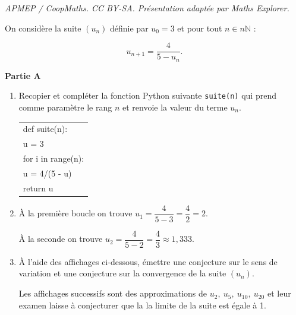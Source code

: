 \documentclass[10pt]{article}
\providecommand{\N}{\mathbb{N}}
\begin{document}
\noindent\textit{APMEP / CoopMaths. CC BY-SA. Présentation adaptée par Maths Explorer.}\par\medskip
\medskip





On considère la suite $\left(u_n\right)$ définie par $u_0 = 3$ et pour tout $n \in n\N$ :

\[u_{n+1} = \dfrac{4}{5 - u_n}.\]

\medskip

\textbf{Partie A}

\medskip

\begin{enumerate}
\item Recopier et compléter la fonction Python suivante \texttt{suite(n)} qui prend comme
paramètre le rang $n$ et renvoie la valeur du terme $u_n$.

\begin{center}
\begin{tabular}{|l|}\hline
def suite(n):\\
\qquad u = 3\\
\qquad for i in range(n)\quad  :\\
\qquad \qquad u = 4/(5 - u)\\ 
\qquad return u \\ \hline
\end{tabular}
\end{center}

\item 


À la première boucle on trouve $u_1 = \dfrac{4}{5 - 3} = \dfrac{4}{2} = 2$.


À la seconde on trouve $u_2 = \dfrac{4}{5 - 2} = \dfrac{4}{3}\approx 1,333$.

\item À l'aide des affichages ci-dessous, émettre une conjecture sur le sens de variation et une conjecture sur la convergence de la suite $\left(u_n\right)$.













Les affichages successifs sont des approximations de $u_2, \:u_5,\:u_{10}, \: u_{20}$ et leur examen laisse à conjecturer que la la limite de la suite est égale à 1.
\end{enumerate}
\end{document}

